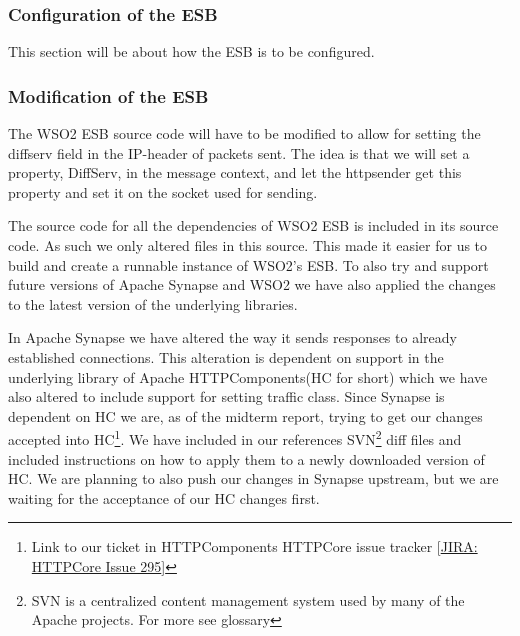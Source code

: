     \subsubsection{Configuration of the ESB}\label{Configuration of the ESB} 
    This section will be about how the ESB is to be configured.

    \subsubsection{Modification of the ESB}\label{Modification of the ESB} 
		The WSO2 ESB source code will have to be modified to allow for setting the diffserv field in the IP-header of packets sent. The idea is that we will set a property, DiffServ, in the message context, and let the httpsender get this property and set it on the socket used for sending.

The source code for all the dependencies of WSO2 ESB is included in its source code. As such we only altered files in this source. This made it easier for us to build and create a runnable instance of WSO2’s ESB. To also try and support future versions of Apache Synapse and WSO2 we have also applied the changes to the latest version of the underlying libraries.

In Apache Synapse we have altered the way it sends responses to already established connections. This alteration is dependent on support in the underlying library of Apache HTTPComponents(HC for short) which we have also altered to include support for setting traffic class. Since Synapse is dependent on HC we are, as of the midterm report, trying to get our changes accepted into HC\footnote{Link to our ticket in HTTPComponents HTTPCore issue tracker  [\href{https://issues.apache.org/jira/browse/HTTPCORE-295}{JIRA: HTTPCore Issue 295}]}. We have included in our references SVN\footnote{SVN is a centralized content management system used by many of the Apache projects. For more see glossary} diff files and included instructions on how to apply them to a newly downloaded version of HC. We are planning to also push our changes in Synapse upstream, but we are waiting for the acceptance of our HC changes first.
    

